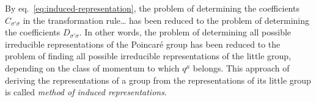 By eq.~\eqref{eq:induced-representation}, the problem of determining the coefficients $C_{\sigma'\sigma}$ in the transformation rule\color{red}\dots\color{black} has been reduced to the problem of determining the coefficients $D_{\sigma'\sigma}$. In other words, the problem of determining all possible irreducible representations of the Poincaré group has been reduced to the problem of finding all possible irreducible representations of the little group, depending on the class of momentum to which $q^\mu$ belongs. This approach of deriving the representations of a group from the representations of its little group is called \emph{method of induced representations}.

